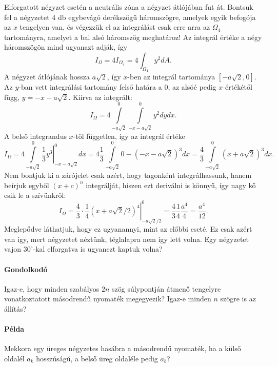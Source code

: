 \documentclass[12pt,a4paper]{scrartcl}
\begin{document}
Elforgatott négyzet esetén a neutrális zóna a négyzet átlójában fut át. Bontsuk fel a négyzetet 4 db egybevágó derékszögű háromszögre, amelyek egyik befogója az $x$ tengelyen van, és végezzük el az integrálást csak erre arra az $\Omega_4$ tartományra, amelyet a bal alsó háromszög meghatároz! Az integrál értéke a négy háromszögön mind ugyanazt adják, így
\[{I_\Omega } = 4{I_{{\Omega _4}}} = 4\int_{{\Omega _4}} {{y^2}dA}.\]
A négyzet átlójának hossza $a\sqrt 2 $, így $x$-ben az integrál tartománya $\left[ { - a\sqrt 2 ,0} \right]$. Az $y$-ban vett integrálási tartomány felső határa a 0, az alsóé pedig $x$ értékétől függ, $y =  - x - a\sqrt 2 $. Kiírva az integrált:
\[{I_\Omega } = 4\int\limits_{ - a\sqrt 2 }^0 {\int\limits_{ - x - a\sqrt 2 }^0 {{y^2}} dy} dx.\]
A belső integrandus $x$-től független, így az integrál értéke
\[{I_\Omega } = 4\int\limits_{ - a\sqrt 2 }^0 {\left. {\frac{1}{3}{y^3}} \right|_{ - x - a\sqrt 2 }^0} dx = 4\frac{1}{3}\int\limits_{ - a\sqrt 2 }^0 {0 - {{\left( { - x - a\sqrt 2 } \right)}^3}} dx = \frac{4}{3}\int\limits_{ - a\sqrt 2 }^0 {{{\left( {x + a\sqrt 2 } \right)}^3}dx} .\]
Nem bontjuk ki a zárójelet csak azért, hogy tagonként integrálhassunk, hanem beírjuk egyből ${\left( {x + c} \right)^n}$ integrálját, hiszen ezt deriválni is könnyű, így nagy kő esik le a szívünkről:
\[{I_\Omega } = \frac{4}{3} \cdot \left. {\frac{1}{4}{{\left( {x + a\sqrt 2 /2} \right)}^4}} \right|_{ - a\sqrt 2 /2}^0 = \frac{4}{3}\frac{1}{4}\frac{{{a^4}}}{4} = \frac{{{a^4}}}{{12}}.\]
Meglepődve láthatjuk, hogy ez ugyanannyi, mint az előbbi eseté. Ez csak azért van így, mert négyzetet néztünk, téglalapra nem így lett volna. Egy négyzetet vajon $30^\circ$-kal elforgatva is ugyanezt kaptuk volna?

\paragraph{Gondolkodó}
Igaz-e, hogy minden szabályos $2n$ szög súlypontján átmenő tengelyre vonatkoztatott másodrendű nyomaték megegyezik? Igaz-e minden $n$ szögre is az állítás?

\paragraph{Példa}
Mekkora egy üreges négyzetes hasábra a másodrendű nyomaték, ha a külső oldalél $a_k$ hosszúságú, a belső üreg oldaléle pedig $a_b$?
\end{document}
